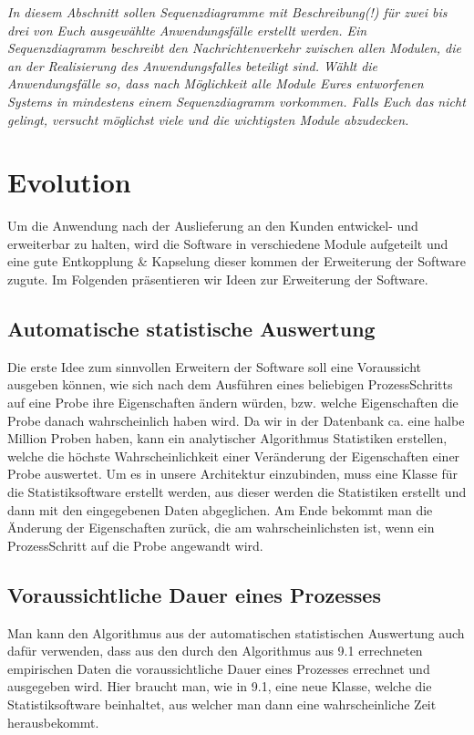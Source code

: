\documentclass[enabledeprecatedfontcommands,fontsize=12pt,paper=a4,twoside]{scrartcl}
\begin{document}
{{\it In diesem Abschnitt sollen Sequenzdiagramme mit Beschreibung(!)
  für zwei bis drei von Euch ausgewählte
    Anwendungsfälle
  erstellt werden. Ein Sequenzdiagramm beschreibt den
  Nachrichtenverkehr zwischen allen Modulen, die an der Realisierung
  des Anwendungsfalles beteiligt sind.  Wählt die
    Anwendungsfälle so, dass nach Möglichkeit alle Module Eures
    entworfenen Systems in mindestens einem Sequenzdiagramm
    vorkommen. Falls Euch das nicht gelingt, versucht möglichst viele
    und die wichtigsten Module abzudecken. }

\section{Evolution}

\label{sec:evolution}
Um die Anwendung nach der Auslieferung an den Kunden entwickel- und erweiterbar zu halten, wird die Software in verschiedene Module aufgeteilt und eine gute Entkopplung \& Kapselung dieser kommen der Erweiterung der Software zugute. Im Folgenden präsentieren wir Ideen zur Erweiterung der Software.

\subsection{Automatische statistische Auswertung} 
{ Die erste Idee zum
  sinnvollen Erweitern der Software soll eine Voraussicht ausgeben können, wie
  sich nach dem Ausführen eines beliebigen ProzessSchritts auf eine Probe ihre
  Eigenschaften ändern würden, bzw. welche Eigenschaften die Probe danach
  wahrscheinlich haben wird. Da wir in der Datenbank ca. eine halbe Million
  Proben haben, kann ein analytischer Algorithmus Statistiken erstellen, welche
  die höchste Wahrscheinlichkeit einer Veränderung der Eigenschaften einer Probe
  auswertet. Um es in unsere Architektur einzubinden, muss eine Klasse für die
  Statistiksoftware erstellt werden, aus dieser werden die Statistiken erstellt
  und dann mit den eingegebenen Daten abgeglichen. Am Ende bekommt man die
  Änderung der Eigenschaften zurück, die am wahrscheinlichsten ist, wenn ein ProzessSchritt auf die Probe angewandt wird.
}
\subsection{Voraussichtliche Dauer eines Prozesses} 
{ Man kann den Algorithmus aus der automatischen statistischen Auswertung auch dafür verwenden, dass aus den durch den Algorithmus aus 9.1 errechneten empirischen Daten die voraussichtliche Dauer eines Prozesses errechnet und ausgegeben wird. Hier braucht man, wie in 9.1, eine neue Klasse, welche die Statistiksoftware beinhaltet, aus welcher man dann eine wahrscheinliche Zeit herausbekommt.
}
}
\end{document}
